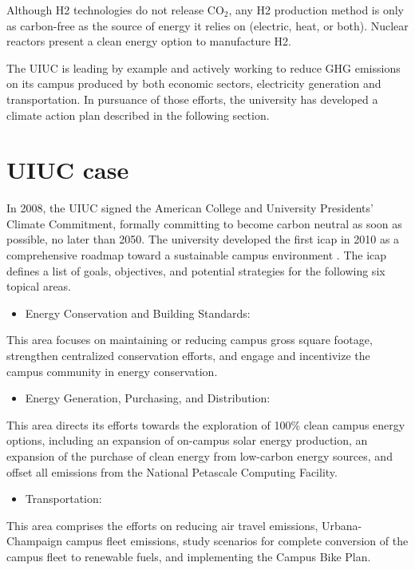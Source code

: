 \documentclass[11pt,letterpaper]{article}
\begin{document}
Although \gls{H2} technologies do not release CO$_2$, any \gls{H2} production method is only as carbon-free as the source of energy it relies on (electric, heat, or both).
Nuclear reactors present a clean energy option to manufacture \gls{H2}.

The \gls{UIUC} is leading by example and actively working to reduce \gls{GHG} emissions on its campus produced by both economic sectors, electricity generation and transportation.
In pursuance of those efforts, the university has developed a climate action plan described in the following section.

\section{\gls{UIUC} case}
In 2008, the \gls{UIUC} signed the American College and University Presidents' Climate Commitment, formally committing to become carbon neutral as soon as possible, no later than 2050.
The university developed the first \gls{icap} in 2010 as a comprehensive roadmap toward a sustainable campus environment \cite{university_of_illinois_at_urbana-champaign_illlinois_2015}.
The \gls{icap} defines a list of goals, objectives, and potential strategies for the following six topical areas.

\begin{itemize}
	\item Energy Conservation and Building Standards:
\end{itemize}
This area focuses on maintaining or reducing campus gross square footage, strengthen centralized conservation efforts, and engage and incentivize the campus community in energy conservation.

\begin{itemize}
	\item Energy Generation, Purchasing, and Distribution:
\end{itemize}
This area directs its efforts towards the exploration of 100\% clean campus energy options, including an expansion of on-campus solar energy production, an expansion of the purchase of clean energy from low-carbon energy sources, and offset all emissions from the National Petascale Computing Facility.

\begin{itemize}
	\item Transportation:
\end{itemize}
This area comprises the efforts on reducing air travel emissions, Urbana-Champaign campus fleet emissions, study scenarios for complete conversion of the campus fleet to renewable fuels, and implementing the Campus Bike Plan.
\end{document}
